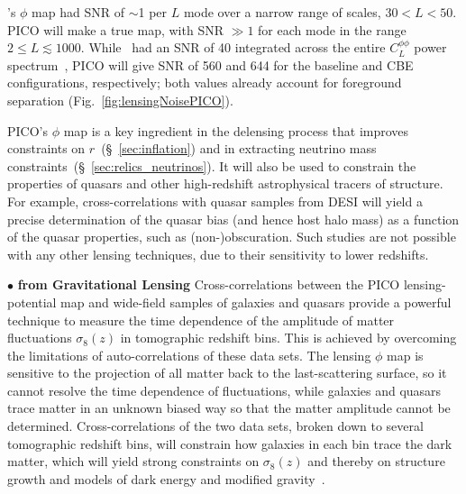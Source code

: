 \documentclass[PICOAPC.tex]{subfiles}
\begin{document}
\planck 's $\phi$ map had \ac{SNR} of $\sim$1 per $L$ mode over a narrow range of scales, $30 < L < 50$. PICO will make a true map, with \ac{SNR} $\gg1$ for each mode in the range $2 \leq L \lesssim 1000$.  While \planck\ had an \ac{SNR} of 40 integrated across the entire $C_{L}^{\phi \phi}$ power spectrum~\citep{2018arXiv180706210P}, PICO will give \ac{SNR} of 560 and 644 for the baseline and CBE configurations, respectively; both values already account for foreground separation (Fig.~\ref{fig:lensingNoisePICO}). 

PICO's $\phi$ map is a key ingredient in the delensing process that improves constraints on $r$~(\S~\ref{sec:inflation}) and in extracting neutrino mass constraints~(\S~\ref{sec:relics_neutrinos}). It will also be used to constrain the properties of quasars and other high-redshift astrophysical tracers of structure.  For example, cross-correlations with quasar samples from DESI will yield a precise determination of the quasar bias (and hence host halo mass) as a function of the quasar properties, such as (non-)obscuration.  Such studies are not possible with any other lensing techniques, due to their sensitivity to lower redshifts.


\noindent$\bullet$ {\bf {} from Gravitational Lensing} \hspace{0.1in} \label{sigma8_lensing}
Cross-correlations between the PICO lensing-potential map and wide-field samples of galaxies and quasars provide a powerful technique to measure the time dependence of the amplitude of matter fluctuations $\sigma_{8}(z)$ in tomographic redshift bins. This is achieved by overcoming the limitations of auto-correlations of these data sets.
The lensing $\phi$ map is sensitive to the projection of all matter back to the last-scattering surface, so it cannot resolve the time dependence of fluctuations, while galaxies and quasars trace matter in an unknown biased way so that the matter amplitude cannot be determined.
Cross-correlations of the two data sets, broken down to several tomographic redshift bins, will constrain how galaxies in each bin trace the dark matter, which will yield strong constraints on $\sigma_8(z)$ and thereby on structure growth and models of dark energy and modified gravity~\citep{2009PhRvL.102b1302S,2018PhRvD..97l3540S}.
\end{document}
